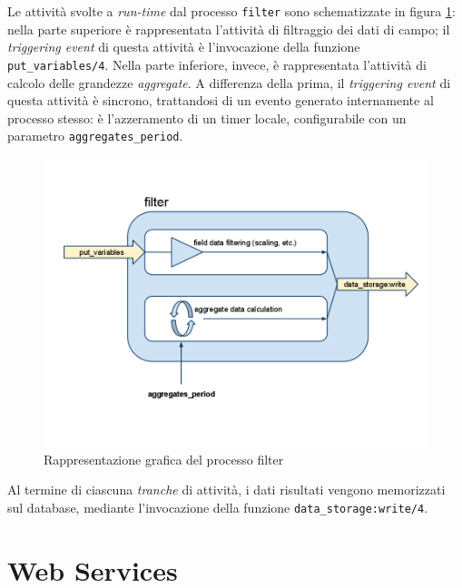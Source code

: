 %
Le attivit\`a svolte a \emph{run-time} dal processo \texttt{filter} sono schematizzate in 
figura \ref{filter}: nella parte superiore \`e rappresentata l'attivit\`a di filtraggio 
dei dati di campo; il \emph{triggering event} di questa attivit\`a \`e l'invocazione della 
funzione \texttt{put\_variables/4}.
%
Nella parte inferiore, invece, \`e rappresentata l'attivit\`a di calcolo delle grandezze 
\emph{aggregate}. A differenza della prima, il \emph{triggering event} di questa attivit\`a
\`e sincrono, trattandosi di un evento generato internamente al processo stesso: 
\`e l'azzeramento di un timer locale, configurabile con un parametro \texttt{aggregates\_period}.
%

%
\begin{figure}[!h]
\centering
\includegraphics[width=380pt]{img/filter.png}
\caption{Rappresentazione grafica del processo filter}
\label{filter}
\end{figure}
%
Al termine di ciascuna \emph{tranche} di attivit\`a, i dati risultati vengono memorizzati sul 
database, mediante l'invocazione della funzione \texttt{data\_storage:write/4}.
%

\section{Web Services}
